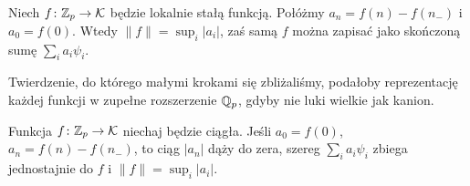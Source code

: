 \begin{fakt}
	Niech $f \colon \mathbb Z_p \to \mathcal K$ będzie lokalnie stałą funkcją.
	Połóżmy $a_n = f(n) - f(n_-)$ i $a_0 = f(0)$.
	Wtedy $\|f\| = \sup_i |a_i|$, zaś samą $f$ można zapisać jako skończoną sumę $\sum_i a_i \psi_i$.
\end{fakt}

Twierdzenie, do którego małymi krokami się zbliżaliśmy, podałoby reprezentację każdej funkcji w zupełne rozszerzenie $\mathbb Q_p$, gdyby nie luki wielkie jak kanion.

\begin{twierdzenie}
	Funkcja $f \colon \mathbb Z_p \to \mathcal K$ niechaj będzie ciągła.
	Jeśli $a_0 = f(0)$, $a_n = f(n) - f(n_-)$, to ciąg $|a_n|$ dąży do zera, szereg $\sum_i a_i \psi_i$ zbiega jednostajnie do $f$ i $\|f\| = \sup_i |a_i|$.
\end{twierdzenie}